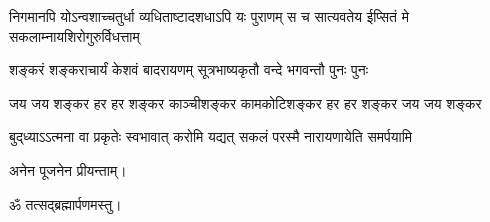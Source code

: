 \fourlineindentedshloka
{निगमानपि योऽन्वशाच्चतुर्धा}
{व्यधिताष्टादशधाऽपि यः पुराणम्}
{स च सात्यवतेय ईप्सितं मे}
{सकलाम्नायशिरोगुरुर्विधत्ताम्}

\twolineshloka
{शङ्करं शङ्कराचार्यं केशवं बादरायणम्}
{सूत्रभाष्यकृतौ वन्दे भगवन्तौ पुनः पुनः}




{जय जय शङ्कर हर हर शङ्कर}
{काञ्चीशङ्कर कामकोटिशङ्कर}
{हर हर शङ्कर जय जय शङ्कर}

{बुद्‌ध्याऽऽत्मना वा प्रकृतेः स्वभावात्}
{करोमि यद्यत् सकलं परस्मै}
{नारायणायेति समर्पयामि}

अनेन पूजनेन \acharyah{} प्रीयन्ताम्।

\centerline{ॐ तत्सद्ब्रह्मार्पणमस्तु।}

\closesection
